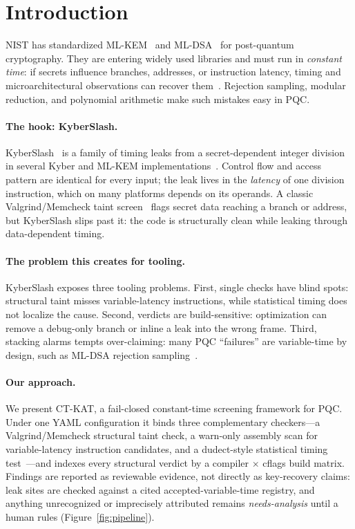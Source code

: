\section{Introduction}
\label{sec:intro}

NIST has standardized ML-KEM~\cite{fips203} and ML-DSA~\cite{fips204} for
post-quantum cryptography. They are entering widely used libraries and must run in
\emph{constant time}: if secrets influence branches, addresses, or instruction
latency, timing and microarchitectural observations can recover them~\cite{kocher}.
Rejection sampling, modular reduction, and polynomial arithmetic make such
mistakes easy in PQC.

\paragraph{The hook: KyberSlash.}
KyberSlash~\cite{kyberslash} is a family of timing leaks from a secret-dependent
integer division in several Kyber and ML-KEM implementations~\cite{kyber}. Control
flow and access pattern are identical for every input; the leak lives in the
\emph{latency} of one division instruction, which on many platforms depends on its
operands. A classic Valgrind/Memcheck taint screen~\cite{valgrind,ctgrind} flags
secret data reaching a branch or address, but KyberSlash slips past it: the code is
structurally clean while leaking through data-dependent timing.

\paragraph{The problem this creates for tooling.}
KyberSlash exposes three tooling problems. First, single checks have blind spots:
structural taint misses variable-latency instructions, while statistical timing
does not localize the cause. Second, verdicts are build-sensitive: optimization can
remove a debug-only branch or inline a leak into the wrong frame. Third, stacking
alarms tempts over-claiming: many PQC ``failures'' are variable-time by design,
such as ML-DSA rejection sampling~\cite{fips204,dilithium}.

\paragraph{Our approach.}
We present CT-KAT, a fail-closed constant-time screening framework for PQC. Under
one YAML configuration it binds three complementary checkers---a Valgrind/Memcheck
structural taint check, a warn-only assembly scan for variable-latency instruction
candidates, and a dudect-style statistical timing test~\cite{dudect}---and indexes
every structural verdict by a compiler $\times$ cflags build matrix. Findings are
reported as reviewable evidence, not directly as key-recovery claims: leak sites
are checked against a cited accepted-variable-time registry, and anything
unrecognized or imprecisely attributed remains \emph{needs-analysis} until a
human rules (Figure~\ref{fig:pipeline}).

